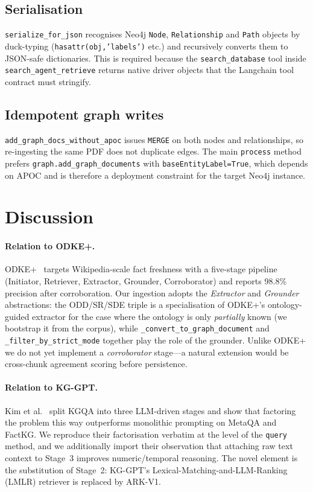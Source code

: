 \documentclass[11pt,a4paper]{article}
\begin{document}
\subsection{Serialisation}

\texttt{serialize\_for\_json} recognises Neo4j \texttt{Node},
\texttt{Relationship} and \texttt{Path} objects by duck-typing
(\texttt{hasattr(obj,'labels')} etc.) and recursively converts them to
JSON-safe dictionaries. This is required because the
\texttt{search\_database} tool inside \texttt{search\_agent\_retrieve}
returns native driver objects that the Langchain tool contract must
stringify.

\subsection{Idempotent graph writes}

\texttt{add\_graph\_docs\_without\_apoc} issues \texttt{MERGE} on both nodes
and relationships, so re-ingesting the same PDF does not duplicate edges. The
main \texttt{process} method prefers \texttt{graph.add\_graph\_documents} with
\texttt{baseEntityLabel=True}, which depends on APOC and is therefore a
deployment constraint for the target Neo4j instance.

\section{Discussion}
\label{sec:discussion}

\paragraph{Relation to ODKE+.}
ODKE+~\cite{odkeplus2025} targets Wikipedia-scale fact freshness with a
five-stage pipeline (Initiator, Retriever, Extractor, Grounder, Corroborator)
and reports 98.8\% precision after corroboration. Our ingestion adopts the
\emph{Extractor} and \emph{Grounder} abstractions: the ODD/SR/SDE triple is a
specialisation of ODKE+'s ontology-guided extractor for the case where the
ontology is only \emph{partially} known (we bootstrap it from the corpus),
while \texttt{\_convert\_to\_graph\_document} and
\texttt{\_filter\_by\_strict\_mode} together play the role of the grounder.
Unlike ODKE+ we do not yet implement a \emph{corroborator} stage---a natural
extension would be cross-chunk agreement scoring before persistence.

\paragraph{Relation to KG-GPT.}
Kim et al.~\cite{kggpt2023} split KGQA into three LLM-driven stages and show
that factoring the problem this way outperforms monolithic prompting on
MetaQA and FactKG. We reproduce their factorisation verbatim at the level
of the \texttt{query} method, and we additionally import their observation
that attaching raw text context to Stage~3 improves numeric/temporal
reasoning. The novel element is the substitution of Stage~2: KG-GPT's
Lexical-Matching-and-LLM-Ranking (LMLR) retriever is replaced by ARK-V1.
\end{document}
